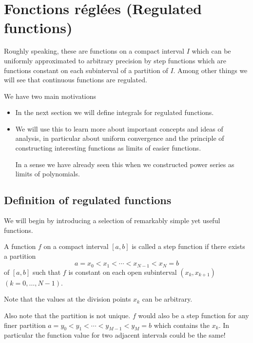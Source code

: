 \documentclass[10pt, a4paper]{article}
\begin{document}
\newpage

\section{Fonctions réglées (Regulated functions)}

Roughly speaking,
these are functions on a compact interval $I$ which can be uniformly approximated to arbitrary precision by step functions which are functions constant on each subinterval of a partition of $I$.
Among other things we will see that continuous functions are regulated.

We have two main motivations
\begin{itemize}
    \item In the next section we will define integrals for regulated functions.
    \item We will use this to learn more about important concepts and ideas of analysis,
    in particular about uniform convergence and the principle of constructing interesting functions as limits of easier functions.

    In a sense we have already seen this when we constructed power series as limits of polynomials.
\end{itemize}

\subsection{Definition of regulated functions}
We will begin by introducing a selection of remarkably simple yet useful functions.
\begin{definition}\label{pre:analy:def:stepfuncs}
    A function $f$ on a compact interval $[a, b]$ is called a step function if there exists a partition
    \[
    a = x_0 < x_1 < \dotsi < x_{N - 1} < x_N = b
    \]
    of $[a, b]$ such that $f$ is constant on each open subinterval $(x_k, x_{k + 1})$ $(k = 0, \dotsc, N - 1)$.

    Note that the values at the division points $x_k$ can be arbitrary.

    Also note that the partition is not unique.
    $f$ would also be a step function for any finer partition $a = y_0 < y_1 < \dotsi < y_{M - 1} < y_M = b$ which contains the $x_k$.
    In particular the function value for two adjacent intervals could be the same!
\end{definition}
\end{document}
